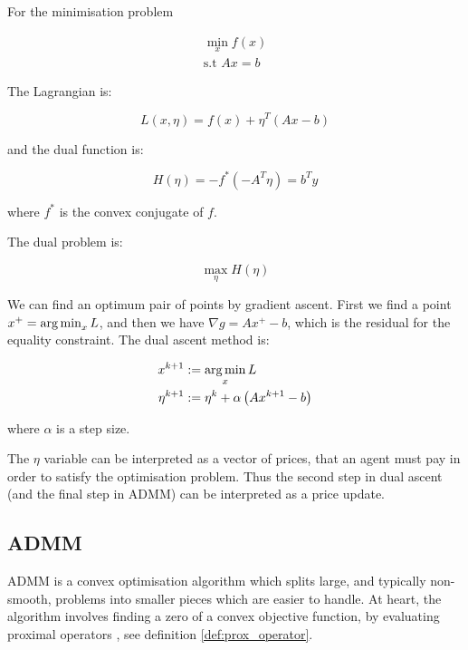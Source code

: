 \begin{example}

For the minimisation problem 

\begin{eqnarray}
\min_x f\left(x\right) \\
\text{s.t } Ax = b
\end{eqnarray}

The Lagrangian is:

\begin{equation}
L\left(x, \eta\right) = f\left(x\right) + \eta^T\left(Ax - b\right)
\end{equation}

and the dual function is:

\begin{equation}
H\left(\eta\right) = -f^*\left(-A^T\eta\right) = b^Ty
\end{equation}

where \(f^*\) is the convex conjugate of \(f\).

The dual problem is:

\begin{equation}
\max_{\eta} H\left(\eta\right)
\end{equation}

We can find an optimum pair of points by gradient ascent. First we find a point \(x^+ = \operatorname*{arg\,min}_x L\), and then we have \(\nabla g = Ax^+ - b\), which is the residual for the equality constraint. The dual ascent method is:

\begin{align}
x^{k+1} &:= \operatorname*{arg\,min}_x L\\
\eta^{k+1} &:= \eta^{k} + \alpha \left(Ax^{k+1} -b \right)
\label{dual-ascent}
\end{align}

where \(\alpha\) is a step size.

The \(\eta\) variable can be interpreted as a vector of prices, that an agent must pay in order to satisfy the optimisation problem. Thus the second step in dual ascent (and the final step in ADMM) can be interpreted as a price update.

\end{example}

\subsection{ADMM}
ADMM is a convex optimisation algorithm which splits large, and typically non-smooth, problems into smaller pieces which are easier to handle. At heart, the algorithm involves finding a zero of a convex objective function, by evaluating proximal operators \cite{parikh2014proximal}, see definition \ref{def:prox_operator}. 


